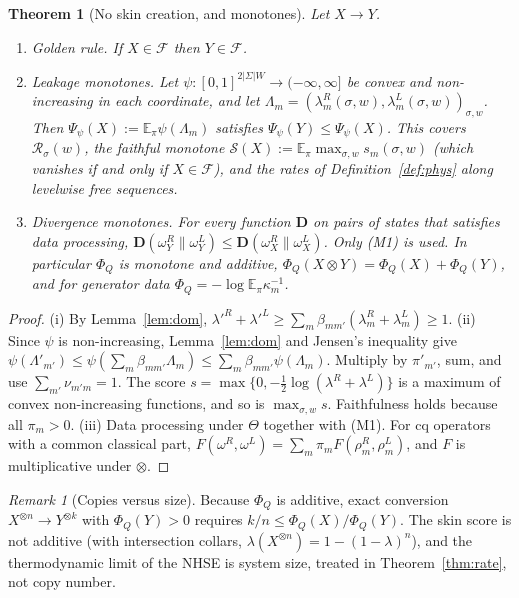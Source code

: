 \documentclass[11pt]{article}
\newtheorem{theorem}{Theorem}
\theoremstyle{definition}
\theoremstyle{remark}
\newtheorem{remark}{Remark}
\newcommand{\E}{\mathbb{E}}
\newcommand{\Free}{\mathcal{F}}
\begin{document}
\begin{theorem}[No skin creation, and monotones]\label{thm:mono}
Let $X\to Y$.
\begin{enumerate}
\item[(i)] \emph{Golden rule.} If $X\in\Free$ then $Y\in\Free$.
\item[(ii)] \emph{Leakage monotones.} Let $\psi:[0,1]^{2|\Sigma|W}\to(-\infty,\infty]$ be convex and non-increasing in each coordinate, and let $\Lambda_m=(\lambda^R_m(\sigma,w),\lambda^L_m(\sigma,w))_{\sigma,w}$. Then $\Psi_\psi(X):=\E_\pi\psi(\Lambda_m)$ satisfies $\Psi_\psi(Y)\le\Psi_\psi(X)$. This covers $\mathcal R_\sigma(w)$, the faithful monotone $\mathcal S(X):=\E_\pi\max_{\sigma,w}s_m(\sigma,w)$ (which vanishes if and only if $X\in\Free$), and the rates of Definition~\ref{def:phys} along levelwise free sequences.
\item[(iii)] \emph{Divergence monotones.} For every function $\mathbf D$ on pairs of states that satisfies data processing, $\mathbf D(\omega^R_Y\|\omega^L_Y)\le\mathbf D(\omega^R_X\|\omega^L_X)$. Only (M1) is used. In particular $\Phi_Q$ is monotone and additive, $\Phi_Q(X\otimes Y)=\Phi_Q(X)+\Phi_Q(Y)$, and for generator data $\Phi_Q=-\log\E_\pi\kappa_m^{-1}$.
\end{enumerate}
\end{theorem}
\begin{proof}
(i) By Lemma~\ref{lem:dom}, $\lambda'^R+\lambda'^L\ge\sum_m\beta_{mm'}(\lambda^R_m+\lambda^L_m)\ge1$.
(ii) Since $\psi$ is non-increasing, Lemma~\ref{lem:dom} and Jensen's inequality give $\psi(\Lambda'_{m'})\le\psi(\sum_m\beta_{mm'}\Lambda_m)\le\sum_m\beta_{mm'}\psi(\Lambda_m)$. Multiply by $\pi'_{m'}$, sum, and use $\sum_{m'}\nu_{m'm}=1$. The score $s=\max\{0,-\frac12\log(\lambda^R+\lambda^L)\}$ is a maximum of convex non-increasing functions, and so is $\max_{\sigma,w}s$. Faithfulness holds because all $\pi_m>0$.
(iii) Data processing under $\Theta$ together with (M1). For cq operators with a common classical part, $F(\omega^R,\omega^L)=\sum_m\pi_mF(\rho^R_m,\rho^L_m)$, and $F$ is multiplicative under $\otimes$.
\end{proof}

\begin{remark}[Copies versus size]\label{rem:copies}
Because $\Phi_Q$ is additive, exact conversion $X^{\otimes n}\to Y^{\otimes k}$ with $\Phi_Q(Y)>0$ requires $k/n\le\Phi_Q(X)/\Phi_Q(Y)$. The skin score is not additive (with intersection collars, $\lambda(X^{\otimes n})=1-(1-\lambda)^n$), and the thermodynamic limit of the NHSE is system size, treated in Theorem~\ref{thm:rate}, not copy number.
\end{remark}
\end{document}

